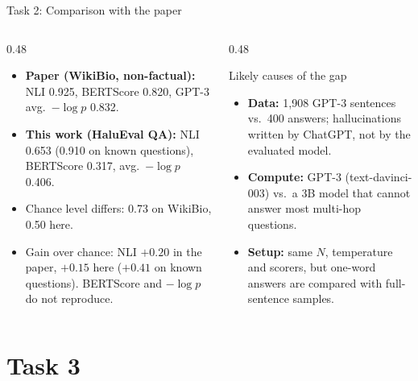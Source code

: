 \documentclass[aspectratio=169,10pt]{beamer}
\begin{document}
\begin{frame}{Task 2: Comparison with the paper}
\begin{columns}[T]
\begin{column}{0.48\textwidth}
\begin{itemize}
  \item \textbf{Paper (WikiBio, non-factual):} NLI 0.925, BERTScore 0.820, GPT-3 avg.\ $-\log p$
        0.832.
  \item \textbf{This work (HaluEval QA):} NLI 0.653 (0.910 on known questions), BERTScore 0.317,
        avg.\ $-\log p$ 0.406.
  \item Chance level differs: 0.73 on WikiBio, 0.50 here.
  \item Gain over chance: NLI $+0.20$ in the paper, $+0.15$ here ($+0.41$ on known questions).
        BERTScore and $-\log p$ do not reproduce.
\end{itemize}
\end{column}
\begin{column}{0.48\textwidth}
\begin{block}{Likely causes of the gap}
\begin{itemize}
  \item \textbf{Data:} 1{,}908 GPT-3 sentences vs.\ 400 answers; hallucinations written by
        ChatGPT, not by the evaluated model.
  \item \textbf{Compute:} GPT-3 (text-davinci-003) vs.\ a 3B model that cannot answer most
        multi-hop questions.
  \item \textbf{Setup:} same $N$, temperature and scorers, but one-word answers are compared
        with full-sentence samples.
\end{itemize}
\end{block}
\end{column}
\end{columns}
\end{frame}

\section{Task 3}
\end{document}
